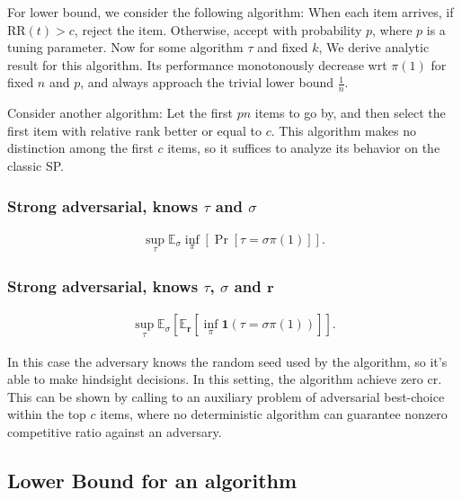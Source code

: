 For lower bound, we consider the following algorithm: When each item arrives, if $\text{RR}(t) > c $, reject the item. Otherwise, accept with probability $p $, where $p $ is a tuning parameter. Now for some algorithm $\tau$ and fixed $k $, We derive analytic result for this algorithm. Its performance monotonously decrease wrt $\pi(1)$ for fixed $n $ and $p $, and always approach the trivial lower bound $\frac{1}{n }$. 

Consider another algorithm: Let the first $pn$ items to go by, and then select the first item with relative rank better or equal to $c $. This algorithm makes no distinction among the first $c $ items, so it suffices to analyze its behavior on the classic SP. 

\subsubsection{Strong adversarial, knows $\tau $ and $\sigma$}

\begin{align*}
	\sup_\tau  \mathbb{E}_\sigma \inf_\pi \left[ \operatorname{Pr}\left[{ 
	\tau = \sigma\pi(1) }   \right]\right] 
.\end{align*}





\subsubsection{Strong adversarial, knows $\tau$,  $\sigma$ and $\mathbf{r}$ }


\begin{align*}
	\sup_\tau  \mathbb{E}_\sigma \left[ \mathbb{E}_{\mathbf{r}} \left[ \inf_\pi  
	\mathbf{1}\left( \tau = \sigma\pi(1) \right)  \right]  \right] 
.\end{align*}

In this case the adversary knows the random seed used by the algorithm, so it's able to make hindsight decisions. In this setting, the algorithm achieve zero cr. This can be shown by calling to an auxiliary problem of adversarial best-choice within the top $c $ items, where no deterministic algorithm can guarantee nonzero competitive ratio against an adversary.


\subsection{Lower Bound for an algorithm}

